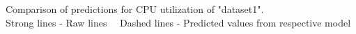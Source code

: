 Comparison of predictions for CPU utilization of "dataset1". \\
Strong lines - Raw lines \  \ 
Dashed lines - Predicted values from respective model